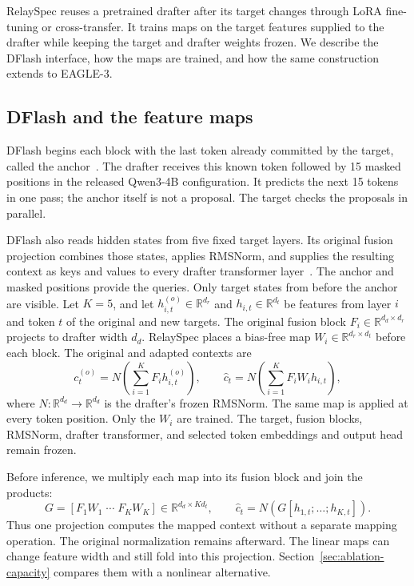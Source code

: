 RelaySpec reuses a pretrained drafter after its target changes through LoRA fine-tuning or cross-transfer. It trains maps on the target features supplied to the drafter while keeping the target and drafter weights frozen. We describe the DFlash interface, how the maps are trained, and how the same construction extends to EAGLE-3.

\subsection{DFlash and the feature maps}
\label{sec:dflash-background}
\label{sec:method-inputs}
DFlash begins each block with the last token already committed by the target, called the anchor~\citep{chen2026dflash}. The drafter receives this known token followed by 15 masked positions in the released Qwen3-4B configuration. It predicts the next 15 tokens in one pass; the anchor itself is not a proposal. The target checks the proposals in parallel.

DFlash also reads hidden states from five fixed target layers. Its original fusion projection combines those states, applies RMSNorm, and supplies the resulting context as keys and values to every drafter transformer layer~\citep{chen2026dflash,zhang2019rmsnorm}. The anchor and masked positions provide the queries. Only target states from before the anchor are visible. Let $K=5$, and let $h^{(o)}_{i,t}\in\mathbb R^{d_r}$ and $h_{i,t}\in\mathbb R^{d_t}$ be features from layer $i$ and token $t$ of the original and new targets. The original fusion block $F_i\in\mathbb R^{d_d\times d_r}$ projects to drafter width $d_d$. RelaySpec places a bias-free map $W_i\in\mathbb R^{d_r\times d_t}$ before each block. The original and adapted contexts are
\begin{equation}
 c^{(o)}_t=N\!\left(\sum_{i=1}^{K}F_i h^{(o)}_{i,t}\right),
 \qquad
 \widehat c_t=N\!\left(\sum_{i=1}^{K}F_iW_i h_{i,t}\right),
 \label{eq:mapped-context}
\end{equation}
where $N:\mathbb R^{d_d}\to\mathbb R^{d_d}$ is the drafter's frozen RMSNorm. The same map is applied at every token position. Only the $W_i$ are trained. The target, fusion blocks, RMSNorm, drafter transformer, and selected token embeddings and output head remain frozen.

Before inference, we multiply each map into its fusion block and join the products:
\begin{equation}
 G=[F_1W_1\;\cdots\;F_KW_K]\in\mathbb R^{d_d\times Kd_t},
 \qquad \widehat c_t=N(G[h_{1,t};\ldots;h_{K,t}]).
 \label{eq:folded-fusion}
\end{equation}
Thus one projection computes the mapped context without a separate mapping operation. The original normalization remains afterward. The linear maps can change feature width and still fold into this projection. Section~\ref{sec:ablation-capacity} compares them with a nonlinear alternative.

